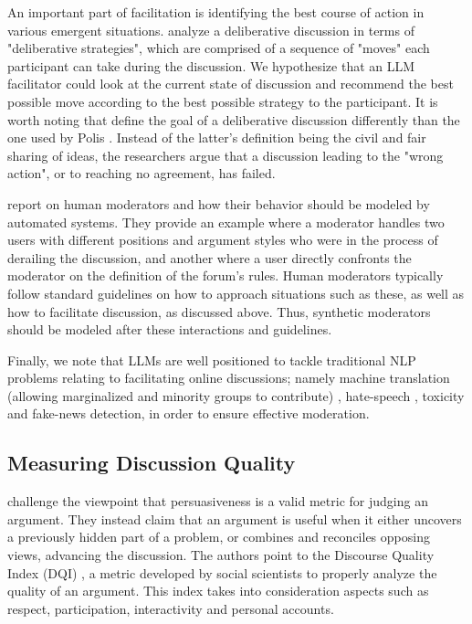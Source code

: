 An important part of facilitation is identifying the best course of action in various emergent situations. \citet{al-khatib-etal-2018-modeling} analyze a deliberative discussion in terms of "deliberative strategies", which are comprised of a sequence of "moves" each participant can take during the discussion. We hypothesize that an LLM facilitator could look at the current state of discussion and recommend the best possible move according to the best possible strategy to the participant. It is worth noting that \citet{al-khatib-etal-2018-modeling} define the goal of a deliberative discussion differently than the one used by Polis \cite{small-polis-llm}. Instead of the latter's definition being the civil and fair sharing of ideas, the researchers argue that a discussion leading to the "wrong action", or to reaching no agreement, has failed.

\citet{vecchi-2021-towards} report on human moderators and how their behavior should be modeled by automated systems. They provide an example where a moderator handles two users with different positions and argument styles who were in the process of derailing the discussion, and another where a user directly confronts the moderator on the definition of the forum's rules. Human moderators typically follow standard guidelines on how to approach situations such as these, as well as how to facilitate discussion, as discussed above. Thus, synthetic moderators should be modeled after these interactions and guidelines.

Finally, we note that LLMs are well positioned to tackle traditional \ac{NLP} problems relating to facilitating online discussions; namely machine translation (allowing marginalized and minority groups to contribute) \cite{Tsai2024Generative}, hate-speech \cite{Nirmal2024TowardsIH, shi-2024-hatespeech}, toxicity \cite{kang-qian-2024-implanting, Wang2022ToxicityDW} and fake-news \cite{Liu2024DetectIJ, Xu2024ACS} detection, in order to ensure effective moderation. 


\subsection{Measuring Discussion Quality}
\label{sec:related:measures}

\citet{vecchi-2021-towards} challenge the viewpoint that persuasiveness is a valid metric for judging an argument. They instead claim that an argument is useful when it either uncovers a previously hidden part of a problem, or combines and reconciles opposing views, advancing the discussion. The authors point to the Discourse Quality Index (DQI) \cite{Steiner2005-STEDPI-8, stab-gurevych-2017-parsing}, a metric developed by social scientists to properly analyze the quality of an argument. This index takes into consideration aspects such as respect, participation, interactivity and personal accounts.

